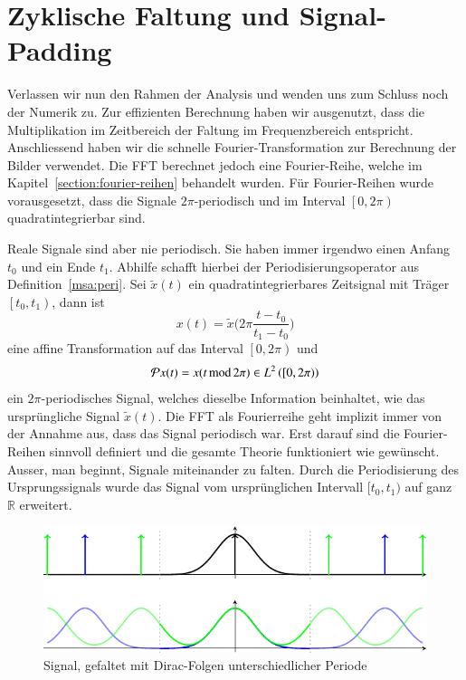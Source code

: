 \section{Zyklische Faltung und Signal-Padding}
\label{complex:circ-conv-padding}
Verlassen wir nun den Rahmen der Analysis und wenden uns zum Schluss noch der Numerik zu.
Zur effizienten Berechnung haben wir ausgenutzt, dass die Multiplikation im Zeitbereich der Faltung im Frequenzbereich entspricht.
Anschliessend haben wir die schnelle Fourier-Transformation zur Berechnung der Bilder verwendet.
Die FFT berechnet jedoch eine Fourier-Reihe, welche im Kapitel~\ref{section:fourier-reihen} behandelt wurden.
Für Fourier-Reihen wurde vorausgesetzt, dass die Signale $2\pi$-periodisch und im Interval $\left[0, 2\pi\right)$ quadratintegrierbar sind.

Reale Signale sind aber nie periodisch.
Sie haben immer irgendwo einen Anfang $t_0$ und ein Ende $t_1$.
Abhilfe schafft hierbei der Periodisierungsoperator aus Definition~\ref{msa:peri}.
Sei $\tilde{x}(t)$ ein quadratintegrierbares Zeitsignal mit Träger $\left[t_0, t_1\right)$, dann ist
\[
	x(t) = \tilde{x}\biggl(2\pi\frac{t-t_0}{t_1-t_0}\biggr)
\]
eine affine Transformation auf das Interval $\left[0, 2\pi \right)$ und
\[
	\Peri x(t) = x( t \,\text{mod}\, 2\pi) \in L^2\left(\left[0, 2\pi \right)\right)
\]
ein $2\pi$-periodisches Signal, welches dieselbe Information beinhaltet, wie das ursprüngliche Signal $\tilde{x}(t)$.
Die FFT als Fourierreihe geht implizit immer von der Annahme aus, dass das Signal periodisch war.
Erst darauf sind die Fourier-Reihen sinnvoll definiert und die gesamte Theorie funktioniert wie gewünscht.
Ausser, man beginnt, Signale miteinander zu falten.
Durch die Periodisierung des Ursprungssignals wurde das Signal vom ursprünglichen Intervall $[t_0, t_1)$ auf ganz $\mathbb{R}$ erweitert.

\begin{figure}
	\centering
	\includegraphics{papers/complex/images/cyclic_conv.pdf}
	\caption{Signal, gefaltet mit Dirac-Folgen unterschiedlicher Periode}
	\label{complex:cyclic-conv}
\end{figure}

